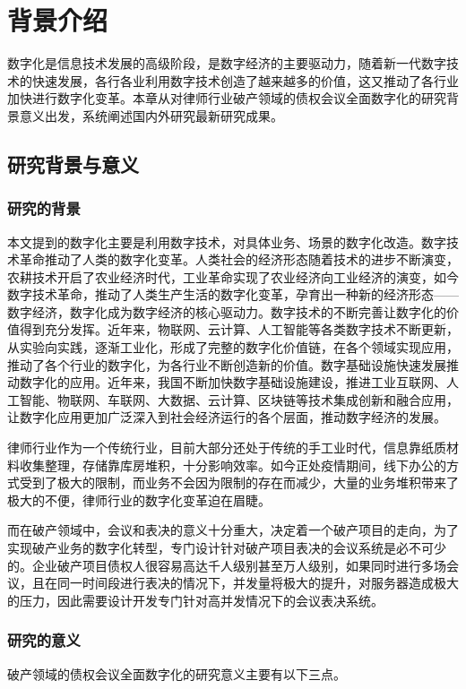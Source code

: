 
\chapter{背景介绍}

数字化是信息技术发展的高级阶段，是数字经济的主要驱动力，随着新一代数字技术的快速发展，各行各业利用数字技术创造了越来越多的价值，这又推动了各行业加快进行数字化变革。本章从对律师行业破产领域的债权会议全面数字化的研究背景意义出发，系统阐述国内外研究最新研究成果。

\section{研究背景与意义}

\subsection{研究的背景}
本文提到的数字化主要是利用数字技术，对具体业务、场景的数字化改造。数字技术革命推动了人类的数字化变革。人类社会的经济形态随着技术的进步不断演变，农耕技术开启了农业经济时代，工业革命实现了农业经济向工业经济的演变，如今数字技术革命，推动了人类生产生活的数字化变革，孕育出一种新的经济形态——数字经济，数字化成为数字经济的核心驱动力。数字技术的不断完善让数字化的价值得到充分发挥。近年来，物联网、云计算、人工智能等各类数字技术不断更新，从实验向实践，逐渐工业化，形成了完整的数字化价值链，在各个领域实现应用，推动了各个行业的数字化，为各行业不断创造新的价值。数字基础设施快速发展推动数字化的应用。近年来，我国不断加快数字基础设施建设，推进工业互联网、人工智能、物联网、车联网、大数据、云计算、区块链等技术集成创新和融合应用，让数字化应用更加广泛深入到社会经济运行的各个层面，推动数字经济的发展。

律师行业作为一个传统行业，目前大部分还处于传统的手工业时代，信息靠纸质材料收集整理，存储靠库房堆积，十分影响效率。如今正处疫情期间，线下办公的方式受到了极大的限制，而业务不会因为限制的存在而减少，大量的业务堆积带来了极大的不便，律师行业的数字化变革迫在眉睫。

而在破产领域中，会议和表决的意义十分重大，决定着一个破产项目的走向，为了实现破产业务的数字化转型，专门设计针对破产项目表决的会议系统是必不可少的。企业破产项目债权人很容易高达千人级别甚至万人级别，如果同时进行多场会议，且在同一时间段进行表决的情况下，并发量将极大的提升，对服务器造成极大的压力，因此需要设计开发专门针对高并发情况下的会议表决系统。

\subsection{研究的意义}
破产领域的债权会议全面数字化的研究意义主要有以下三点。

